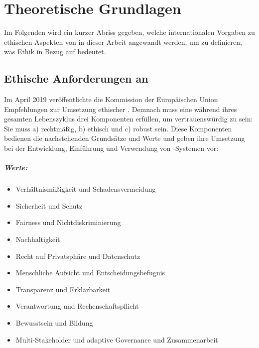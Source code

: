 \documentclass[hidelinks,12pt]{report}
\begin{document}

\chapter{Theoretische Grundlagen}
Im Folgenden wird ein kurzer Abriss gegeben, welche internationalen Vorgaben zu ethischen Aspekten von  in dieser Arbeit angewandt werden, um zu definieren, was Ethik in Bezug auf  bedeutet.
\section{Ethische Anforderungen an }\label{def_ai}

Im April 2019 veröffentlichte die Kommission der Europäischen Union Empfehlungen zur Umsetzung ethischer  \cite{EUCommision}.
Demnach muss eine  während ihres gesamten Lebenszyklus drei Komponenten erfüllen, um vertrauenswürdig zu sein: Sie muss a) rechtmäßig, b) ethisch und c) robust sein. Diese Komponenten bedienen die nachstehenden Grundsätze und Werte und geben ihre Umsetzung bei der Entwicklung, Einführung und Verwendung von -Systemen vor:

\paragraph{Werte:}
\begin{itemize}
	\item  Verhältnismäßigkeit und Schadensvermeidung
	\item  Sicherheit und Schutz
	\item  Fairness und Nichtdiskriminierung
	\item  Nachhaltigkeit
	\item  Recht auf Privatsphäre und Datenschutz
	\item  Menschliche Aufsicht und Entscheidungsbefugnis
	\item  Transparenz und Erklärbarkeit
	\item  Verantwortung und Rechenschaftspflicht
	\item  Bewusstsein und Bildung
	\item Multi-Stakeholder und adaptive Governance und Zusammenarbeit
\end{itemize}
\end{document}
